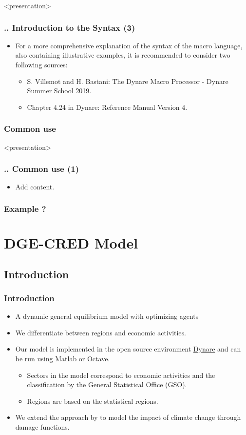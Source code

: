 \documentclass[11pt,aspectratio=169]{beamer}
\begin{document}
\begin{frame}<presentation>
	\frametitle{{\thesection.\thesubsection.\thesubsubsection} Introduction to the Syntax (3)}
	\begin{itemize}
		\justifying
		\item For a more comprehensive explanation of the syntax of the macro language, also containing illustrative examples, it is recommended to consider two following sources:
		\begin{itemize}
			\item S. Villemot and H. Bastani: The Dynare Macro Processor - Dynare Summer School 2019.
			\item Chapter 4.24 in Dynare: Reference Manual Version 4.
		\end{itemize}
	\end{itemize}
\end{frame}
\subsubsection{Common use}
\begin{frame}<presentation>
	\frametitle{{\thesection.\thesubsection.\thesubsubsection} Common use (1)}
	\begin{itemize}
		\item Add content.
	\end{itemize}
\end{frame}
\subsubsection{Example ?}

\section{DGE-CRED Model}

\subsection{Introduction}
\begin{frame}[plain]
\frametitle{Introduction}
\begin{itemize}
\item A dynamic general equilibrium model with optimizing agents
\item We differentiate between regions and economic activities.
\item Our model is implemented in the open source environment \href{https://www.dynare.org/}{Dynare} and can be run using Matlab or Octave.
\begin{itemize}
	\item Sectors in the model correspond to economic activities and the classification by the General Statistical Office (GSO).
	\item Regions are based on the statistical regions.
\end{itemize}
\item We extend the approach by \cite{nordhaus1993optimal} to model the impact of climate change through damage functions.
\end{itemize}
\end{frame}
\end{document}
